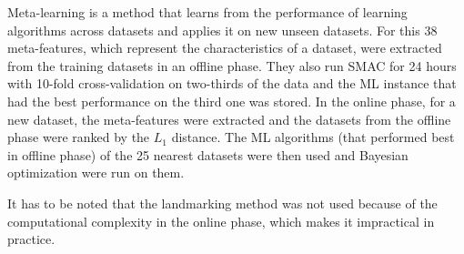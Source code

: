Meta-learning \cite{Brazdil2010MetalearningMining.} is a  method that learns from the performance of learning algorithms across datasets and applies it on new unseen datasets.
For this 38 meta-features, which represent the characteristics of a dataset, were extracted from the training datasets in an offline phase.
They also run SMAC \cite{HutterSequentialConfiguration} for 24 hours with 10-fold cross-validation on two-thirds of the data and the ML instance that had the best performance on the third one was stored.
In the online phase, for a new dataset, the meta-features were extracted and the datasets from the offline phase were ranked by the $L_1$ distance. 
The ML algorithms (that performed best in offline phase) of the 25 nearest datasets were then used and Bayesian optimization were run on them.

It has to be noted that the landmarking \cite{Pfahringer2000Meta-LearningAlgorithms} method was not used because of the computational complexity in the online phase, which makes it impractical in practice.

